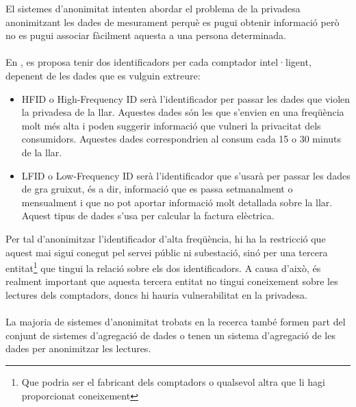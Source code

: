 
El sistemes d'anonimitat intenten abordar el problema de la privadesa anonimitzant les dades de mesurament perquè es pugui obtenir informació però no es pugui associar fàcilment aquesta a una persona determinada.
\\\\
En \cite{anonimity}, es proposa tenir dos identificadors per cada comptador intel·ligent, depenent de les dades que es vulguin extreure:
\begin{itemize}
	\item HFID o High-Frequency ID serà l'identificador per passar les dades que violen la privadesa de la llar. Aquestes dades són les que s'envien en una freqüència molt més alta i poden suggerir informació que vulneri la privacitat dels consumidors. Aquestes dades correspondrien al consum cada 15 o 30 minuts de la llar.
	\item LFID o Low-Frequency ID serà l'identificador que s'usarà per passar les dades de gra gruixut, és a dir, informació que es passa setmanalment o mensualment i que no pot aportar informació molt detallada sobre la llar. Aquest tipus de dades s'usa per calcular la factura elèctrica.
\end{itemize}
Per tal d'anonimitzar l'identificador d'alta freqüència, hi ha la restricció que aquest mai sigui conegut pel servei públic ni subestació, sinó per una tercera entitat\footnote{Que podria ser el fabricant dels comptadors o qualsevol altra que li hagi proporcionat coneixement} que tingui la relació sobre els dos identificadors. A causa d'això, és realment important que aquesta tercera entitat no tingui coneixement sobre les lectures dels comptadors, doncs hi hauria vulnerabilitat en la privadesa.
\\
\\
La majoria de sistemes d'anonimitat trobats en la recerca també formen part del conjunt de sistemes d'agregació de dades o tenen un sistema d'agregació de les dades per anonimitzar les lectures.
